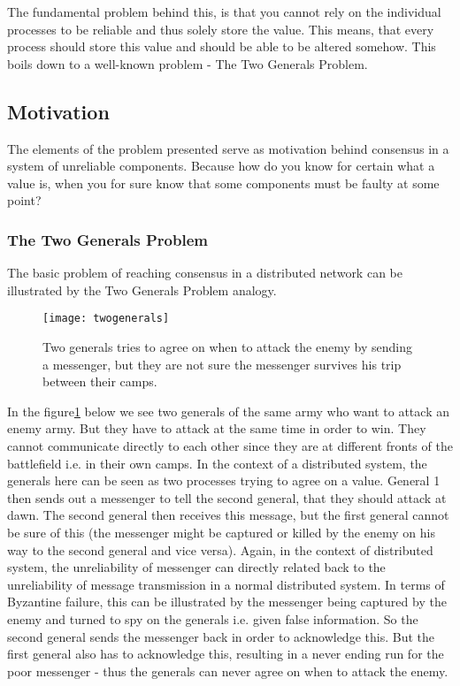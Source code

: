 The fundamental problem behind this, is that you cannot rely on the individual processes to be reliable and thus solely store the value. This means, that every process should store this value and should be able to be altered somehow. This boils down to a well-known problem - The Two Generals Problem.



\subsection{Motivation}
The elements of the problem presented serve as motivation behind consensus in a system of unreliable components. Because how do you know for certain what a value is, when you for sure know that some components must be faulty at some point?

\subsubsection{The Two Generals Problem}
The basic problem of reaching consensus in a distributed network can be illustrated by the Two Generals Problem analogy.

\begin{figure}[h]
	\centering
	\texttt{[image: twogenerals]}
	\caption{Two generals tries to agree on when to attack the enemy by sending a messenger, but they are not sure the messenger survives his trip between their camps.}
	\label{generals}
\end{figure}

In the figure\ref{generals} below we see two generals of the same army who want to attack an enemy army. But they have to attack at the same time in order to win. They cannot communicate directly to each other since they are at different fronts of the battlefield i.e. in their own camps. In the context of a distributed system, the generals here can be seen as two processes trying to agree on a value.
General 1 then sends out a messenger to tell the second general, that they should attack at dawn. The second general then receives this message, but the first general cannot be sure of this (the messenger might be captured or killed by the enemy on his way to the second general and vice versa). Again, in the context of distributed system, the unreliability of messenger can directly related back to the unreliability of message transmission in a normal distributed system. In terms of Byzantine failure, this can be illustrated by the messenger being captured by the enemy and turned to spy on the generals i.e. given false information.
So the second general sends the messenger back in order to acknowledge this. But the first general also has to acknowledge this, resulting in a never ending run for the poor messenger - thus the generals can never agree on when to attack the enemy.

